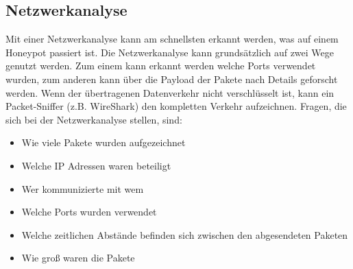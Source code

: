 \subsection{Netzwerkanalyse}
Mit einer Netzwerkanalyse kann am schnellsten erkannt werden, was auf einem Honeypot passiert ist. Die Netzwerkanalyse kann grundsätzlich auf zwei Wege genutzt werden. Zum einem kann erkannt werden welche Ports verwendet wurden, zum anderen kann über die Payload der Pakete nach Details geforscht werden. Wenn der übertragenen Datenverkehr nicht verschlüsselt ist, kann ein Packet-Sniffer (z.B. WireShark) den kompletten Verkehr aufzeichnen. Fragen, die sich bei der Netzwerkanalyse stellen, sind:

\begin{itemize}
\item Wie viele Pakete wurden aufgezeichnet
\item Welche IP Adressen waren beteiligt
\item Wer kommunizierte mit wem
\item Welche Ports wurden verwendet
\item Welche zeitlichen Abstände befinden sich zwischen den abgesendeten Paketen
\item Wie groß waren die Pakete
\end{itemize} 

